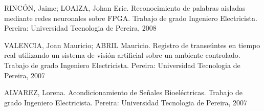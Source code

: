 \documentclass[a4paper, 12pt, oneside]{article}
\begin{document}
	RINCÓN, Jaime; LOAIZA, Johan Eric. Reconocimiento de palabras aisladas mediante redes neuronales sobre FPGA. Trabajo de grado Ingeniero Electricista. Pereira: Universidad Tecnologia de Pereira, 2008
	
	VALENCIA, Joan Mauricio; ABRIL Mauricio. Registro de transeúntes en tiempo real utilizando un sistema de visión artificial sobre un ambiente controlado. Trabajo de grado Ingeniero Electricista. Pereira: Universidad Tecnologia de Pereira, 2007
	
	ALVAREZ, Lorena. Acondicionamiento de Señales Bioeléctricas. Trabajo de grado Ingeniero Electricista. Pereira: Universidad Tecnologia de Pereira, 2007
	
	\clearpage
\end{document}
